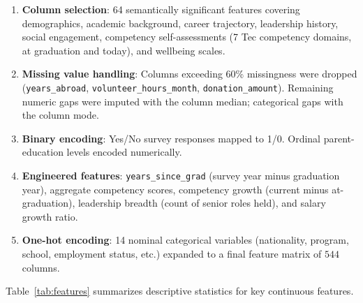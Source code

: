 \documentclass[10pt,twocolumn]{article}
\newenvironment{compactenum}{%
  \begin{enumerate}%
  \setlength{\itemsep}{1pt}\setlength{\parskip}{0pt}\setlength{\parsep}{0pt}%
}{\end{enumerate}}
\begin{document}
\begin{compactenum}
  \item \textbf{Column selection}: 64 semantically significant features
  covering demographics, academic background, career trajectory, leadership
  history, social engagement, competency self-assessments (7 Tec competency
  domains, at graduation and today), and wellbeing scales.
  \item \textbf{Missing value handling}: Columns exceeding 60\% missingness
  were dropped (\texttt{years\_abroad}, \texttt{volunteer\_hours\_month},
  \texttt{donation\_amount}). Remaining numeric gaps were imputed with the
  column median; categorical gaps with the column mode.
  \item \textbf{Binary encoding}: Yes/No survey responses mapped to 1/0.
  Ordinal parent-education levels encoded numerically.
  \item \textbf{Engineered features}: \texttt{years\_since\_grad} (survey year
  minus graduation year), aggregate competency scores, competency growth
  (current minus at-graduation), leadership breadth (count of senior roles
  held), and salary growth ratio.
  \item \textbf{One-hot encoding}: 14 nominal categorical variables
  (nationality, program, school, employment status, etc.) expanded to a final
  feature matrix of $544$ columns.
\end{compactenum}

Table~\ref{tab:features} summarizes descriptive statistics for key continuous
features.

\begin{table}[H]
\centering
\caption{Descriptive statistics for key continuous features (full sample).}
\label{tab:features}
\end{table}
\end{document}
